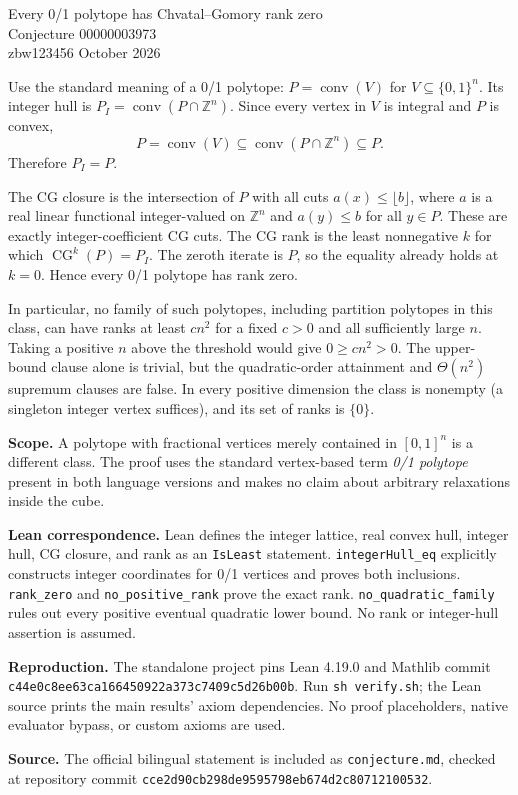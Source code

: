 \documentclass[11pt]{article}
\begin{document}
\begin{center}{\Large Every 0/1 polytope has Chvatal--Gomory rank zero}\\[6pt]
{\large Conjecture 00000003973}\\[5pt]
zbw123456  October 2026\end{center}

Use the standard meaning of a 0/1 polytope:
$P=\operatorname{conv}(V)$ for $V\subseteq\{0,1\}^n$.
Its integer hull is $P_I=\operatorname{conv}(P\cap\mathbb Z^n)$.
Since every vertex in $V$ is integral and $P$ is convex,
\[
P=\operatorname{conv}(V)\subseteq
\operatorname{conv}(P\cap\mathbb Z^n)\subseteq P.
\]
Therefore $P_I=P$.

The CG closure is the intersection of $P$ with all cuts
$a(x)\le\lfloor b\rfloor$, where $a$ is a real linear functional
integer-valued on $\mathbb Z^n$ and $a(y)\le b$ for all $y\in P$.
These are exactly integer-coefficient CG cuts.
The CG rank is the least nonnegative $k$ for which
$\operatorname{CG}^k(P)=P_I$. The zeroth iterate is $P$, so the equality
already holds at $k=0$. Hence every 0/1 polytope has rank zero.

In particular, no family of such polytopes, including partition
polytopes in this class, can have ranks at least $c n^2$ for a fixed
$c>0$ and all sufficiently large $n$. Taking a positive $n$ above the
threshold would give $0\ge c n^2>0$.
The upper-bound clause alone is trivial, but the quadratic-order
attainment and $\Theta(n^2)$ supremum clauses are false.
In every positive dimension the class is nonempty (a singleton integer
vertex suffices), and its set of ranks is $\{0\}$.

\textbf{Scope.} A polytope with fractional vertices merely contained in
$[0,1]^n$ is a different class. The proof uses the standard vertex-based
term \emph{0/1 polytope} present in both language versions and makes no
claim about arbitrary relaxations inside the cube.

\textbf{Lean correspondence.} Lean defines the integer lattice, real
convex hull, integer hull, CG closure, and rank as an \texttt{IsLeast}
statement. \texttt{integerHull\_eq} explicitly constructs integer coordinates
for 0/1 vertices and proves both inclusions.
\texttt{rank\_zero} and \texttt{no\_positive\_rank} prove the exact rank.
\texttt{no\_quadratic\_family} rules out every positive eventual quadratic
lower bound. No rank or integer-hull assertion is assumed.

\textbf{Reproduction.} The standalone project pins Lean 4.19.0 and Mathlib
commit \texttt{c44e0c8ee63ca166450922a373c7409c5d26b00b}.
Run \texttt{sh verify.sh}; the Lean source prints the main results'
axiom dependencies. No proof placeholders, native evaluator bypass, or
custom axioms are used.

\textbf{Source.} The official bilingual statement is included as
\texttt{conjecture.md}, checked at repository commit
\texttt{cce2d90cb298de9595798eb674d2c80712100532}.
\end{document}
